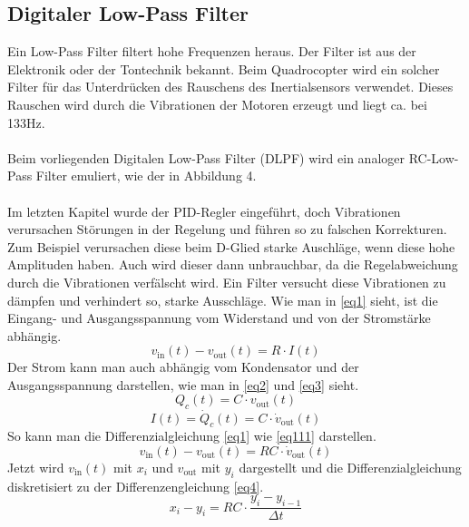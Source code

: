 \documentclass[12pt,a4paper, ngerman]{article}
\begin{document}
\subsection{Digitaler Low-Pass Filter}
Ein Low-Pass Filter filtert hohe Frequenzen heraus. Der Filter ist aus der Elektronik oder der Tontechnik bekannt. Beim Quadrocopter wird ein solcher Filter für das Unterdrücken des Rauschens des Inertialsensors verwendet. Dieses Rauschen wird durch die Vibrationen der Motoren erzeugt und liegt ca. bei 133Hz.\\ \\
Beim vorliegenden Digitalen Low-Pass Filter (DLPF) wird ein analoger RC-Low-Pass Filter emuliert, wie der in Abbildung 4.\cite{website:Wikipedia_LPF}\\ \\
Im letzten Kapitel wurde der PID-Regler eingeführt, doch Vibrationen verursachen Störungen in der Regelung und führen so zu falschen Korrekturen. Zum Beispiel verursachen diese beim D-Glied starke Auschläge, wenn diese hohe Amplituden haben. Auch wird dieser dann unbrauchbar, da die Regelabweichung durch die Vibrationen verfälscht wird. Ein Filter versucht diese Vibrationen zu dämpfen und verhindert so, starke Ausschläge.
Wie man in \ref{eq1} sieht, ist die Eingang- und Ausgangsspannung vom Widerstand und von der Stromstärke abhängig.
\begin{equation} \label{eq1}
v_{\text{in}}(t)-v_{\text{out}}(t)=R\cdot I(t)
\end{equation}
Der Strom kann man auch abhängig vom Kondensator und der Ausgangsspannung darstellen, wie man in \ref{eq2} und \ref{eq3} sieht.
\begin{equation} \label{eq2}
Q_{c}(t)=C\cdot v_{\text{out}}(t)
\end{equation}
\begin{equation} \label{eq3}
I(t)=\dot{Q}_{c}(t)=C\cdot \dot{v}_{\text{out}}(t)
\end{equation}
So kann man die Differenzialgleichung \ref{eq1} wie \ref{eq111} darstellen.\\
\begin{equation} \label{eq111}
v_{\text{in}}(t)-v_{\text{out}}(t)=RC\cdot \dot{v}_{\text{out}}(t)
\end{equation}
Jetzt wird $v_{\text{in}}(t)$ mit $x_{i}$ und $v_{\text{out}}$ mit $y_{i}$ dargestellt und die Differenzialgleichung diskretisiert zu der Differenzengleichung \ref{eq4}.
\begin{equation}\label{eq4}
x_{i}-y_{i}=RC\cdot \frac{y_{i}-y_{i-1}}{\Delta t}
\end{equation}
\end{document}
